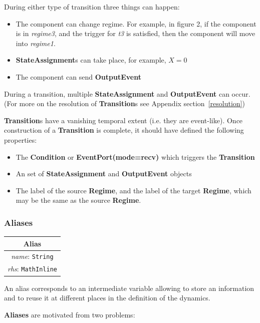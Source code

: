 \documentclass{article}
\newcommand{\nmlClass}[1]{{\bf #1}}
\newcommand{\StateAssignment}{{\bf{StateAssignment}}\xspace}
\newcommand{\OutputEvent}{{\bf{OutputEvent}}\xspace}
\begin{document}
During either type of transition three things can happen:
\begin{itemize}
\item The component can change regime. For example, in figure 2, if
the component is in \emph{regime3}, and the trigger for \emph{t3} is
satisfied, then the component will move into \emph{regime1}.
\item \textbf{StateAssignment}s can take place, for example, $X=0$
\item The component can send \OutputEvent
\end{itemize}

During a transition, multiple \StateAssignment and \OutputEvent can occur.
(For more on the resolution of \nmlClass{Transition}s see Appendix
section~\ref{resolution})

\nmlClass{Transition}s have a vanishing temporal extent (i.e. they are
event-like). Once construction of a \nmlClass{Transition} is complete, it
should have defined the following properties:
\begin{itemize}
\item The \nmlClass{Condition} or \nmlClass{EventPort(mode=recv)} which
triggers the \nmlClass{Transition}
\item An set of \StateAssignment and \OutputEvent objects
\item The label of the source \nmlClass{Regime}, and the label of the target
\nmlClass{Regime}, which may be the same as the source \nmlClass{Regime}.
\end{itemize}

\subsubsection{Aliases}
\label{alias}


\begin{table}[htb]
\center
\begin{tabular}{|c|}
\hline
\hline
Alias \\
\hline
\hline
{\em name}: {\tt String} \\
\hline
{\em rhs}: {\tt MathInline} \\
\hline
\end{tabular}
\end{table}

An alias corresponds to an intermediate variable allowing to store an
information and to reuse it at different places in the definition of
the dynamics. 

\textbf{Aliases} are motivated from two problems:
\end{document}
